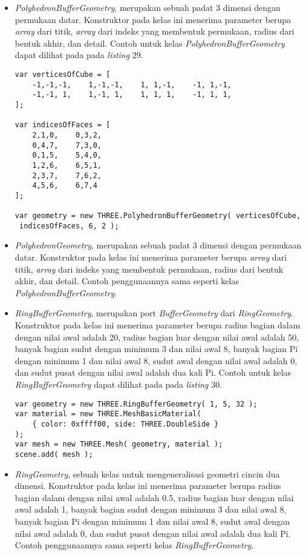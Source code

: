 \documentclass[a4paper,twoside]{article}
\begin{document}
\begin{enumerate}
\begin{itemize}
\begin{itemize}
	\item {\it PolyhedronBufferGeometry}, merupakan sebuah padat 3 dimensi dengan permukaan datar. Konstruktor pada kelas ini menerima parameter berupa {\it array} dari titik, {\it array} dari indeks yang membentuk permukaan, radius dari bentuk akhir, dan detail. Contoh untuk kelas {\it PolyhedronBufferGeometry} dapat dilihat pada pada {\it listing} 29.
	
\begin{lstlisting}[caption={Contoh penggunaan kelas {\it PolyhedronBufferGeometry}.},captionpos=b]
var verticesOfCube = [
    -1,-1,-1,    1,-1,-1,    1, 1,-1,    -1, 1,-1,
    -1,-1, 1,    1,-1, 1,    1, 1, 1,    -1, 1, 1,
];

var indicesOfFaces = [
    2,1,0,    0,3,2,
    0,4,7,    7,3,0,
    0,1,5,    5,4,0,
    1,2,6,    6,5,1,
    2,3,7,    7,6,2,
    4,5,6,    6,7,4
];

var geometry = new THREE.PolyhedronBufferGeometry( verticesOfCube,
 indicesOfFaces, 6, 2 );
\end{lstlisting}

	\item {\it PolyhedronGeometry}, merupakan sebuah padat 3 dimensi dengan permukaan datar. Konstruktor pada kelas ini menerima parameter berupa {\it array} dari titik, {\it array} dari indeks yang membentuk permukaan, radius dari bentuk akhir, dan detail. Contoh penggunaannya sama seperti kelas {\it PolyhedronBufferGeometry}.
	
	\item {\it RingBufferGeometry}, merupakan port {\it BufferGeometry} dari {\it RingGeometry}. Konstruktor pada kelas ini menerima parameter berupa radius bagian dalam dengan nilai awal adalah 20, radius bagian luar dengan nilai awal adalah 50, banyak bagian sudut dengan minimum 3 dan nilai awal 8, banyak bagian Pi dengan minimum 1 dan nilai awal 8, sudut awal dengan nilai awal adalah 0, dan sudut pusat dengan nilai awal adalah dua kali Pi. Contoh untuk kelas {\it RingBufferGeometry} dapat dilihat pada pada {\it listing} 30.
	
\begin{lstlisting}[caption={Contoh penggunaan kelas {\it RingBufferGeometry}.},captionpos=b]
var geometry = new THREE.RingBufferGeometry( 1, 5, 32 );
var material = new THREE.MeshBasicMaterial( 
	{ color: 0xffff00, side: THREE.DoubleSide } 
);
var mesh = new THREE.Mesh( geometry, material );
scene.add( mesh );
\end{lstlisting}

	\item {\it RingGeometry}, sebuah kelas untuk mengeneralisasi geometri cincin dua dimensi. Konstruktor pada kelas ini menerima parameter berupa radius bagian dalam dengan nilai awal adalah 0.5, radius bagian luar dengan nilai awal adalah 1, banyak bagian sudut dengan minimum 3 dan nilai awal 8, banyak bagian Pi dengan minimum 1 dan nilai awal 8, sudut awal dengan nilai awal adalah 0, dan sudut pusat dengan nilai awal adalah dua kali Pi.  Contoh penggunaannya sama seperti kelas {\it RingBufferGeometry}.
	

\end{itemize}
\end{itemize}
\end{enumerate}
\end{document}
